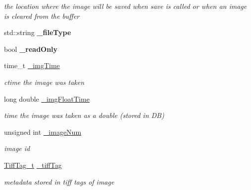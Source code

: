 \begin{DoxyCompactItemize}
\begin{DoxyCompactList}\small\item\em the location where the image will be saved when save is called or when an image is cleared from the buffer \end{DoxyCompactList}\item 
std\+::string {\bfseries \+\_\+file\+Type}\hypertarget{classImage_a42dd30309b9f742238216a6322815728}{}\label{classImage_a42dd30309b9f742238216a6322815728}

\item 
bool {\bfseries \+\_\+read\+Only}\hypertarget{classImage_a9cd61367d13018402e79fdebfb0bf5bc}{}\label{classImage_a9cd61367d13018402e79fdebfb0bf5bc}

\item 
time\+\_\+t \hyperlink{classImage_a6c46324c22609a4e2eeca44f4f7eccd1}{\+\_\+img\+Time}\hypertarget{classImage_a6c46324c22609a4e2eeca44f4f7eccd1}{}\label{classImage_a6c46324c22609a4e2eeca44f4f7eccd1}

\begin{DoxyCompactList}\small\item\em ctime the image was taken \end{DoxyCompactList}\item 
long double \hyperlink{classImage_afb0940623e07e584db3ea1be35e152b4}{\+\_\+img\+Float\+Time}\hypertarget{classImage_afb0940623e07e584db3ea1be35e152b4}{}\label{classImage_afb0940623e07e584db3ea1be35e152b4}

\begin{DoxyCompactList}\small\item\em time the image was taken as a double (stored in DB) \end{DoxyCompactList}\item 
unsigned int \hyperlink{classImage_aacb7c47258bf05483114dc7787ebcbee}{\+\_\+image\+Num}\hypertarget{classImage_aacb7c47258bf05483114dc7787ebcbee}{}\label{classImage_aacb7c47258bf05483114dc7787ebcbee}

\begin{DoxyCompactList}\small\item\em image id \end{DoxyCompactList}\item 
\hyperlink{structImage_1_1TiffTag__t}{Tiff\+Tag\+\_\+t} \hyperlink{classImage_aa127a23a0ab1c7dc3004a96e2d159057}{\+\_\+tiff\+Tag}\hypertarget{classImage_aa127a23a0ab1c7dc3004a96e2d159057}{}\label{classImage_aa127a23a0ab1c7dc3004a96e2d159057}

\begin{DoxyCompactList}\small\item\em metadata stored in tiff tags of image \end{DoxyCompactList}\end{DoxyCompactItemize}


